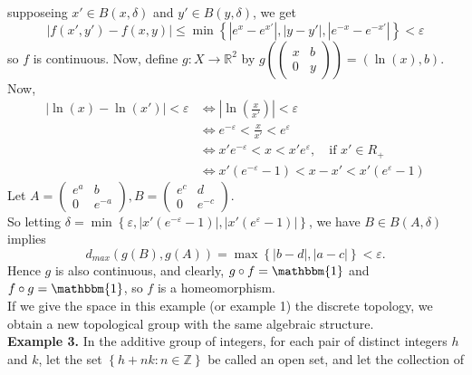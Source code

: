 \documentclass[a4paper]{article}
\theoremstyle{plain}%
\theoremstyle{definition}
\theoremstyle{remark}
\begin{document}
    supposeing $x' \in B(x,\delta)$ and $y' \in B(y,\delta)$, we get
    \[
    \left| f(x',y') - f(x,y) \right| \le 
    \min \left\{ \left| e^{x}-e^{x'} \right| , \left| y-y' \right| ,
    \left| e^{-x}-e^{-x'} \right| \right\} 
    < \varepsilon
    \] 
    so $f$ is continuous. Now, define
    $g  \colon X \to \mathbb{R}^2$ by $g\left( \begin{pmatrix} 
            x & b\\
            0 & y
    \end{pmatrix}  \right) = (\ln(x),b)$.\\
    Now, 
    \begin{align*}
        \left| \ln(x)-\ln(x') \right| < \varepsilon
        &\iff \left| \ln(\frac{x}{x'}) \right| < \varepsilon\\
        &\iff e^{-\varepsilon} < \frac{x}{x'} < e^{\varepsilon}\\
        &\iff x' e^{-\varepsilon} < x < x' e^{\varepsilon}, \quad \text{if }x'
        \in R_+\\
        &\iff x' (e^{-\varepsilon}-1) < x-x' < x'\left( e^{\varepsilon}-1 \right) 
    \end{align*}
    Let $A = \begin{pmatrix} 
        e^{a} & b \\
        0 & e^{-a}
    \end{pmatrix} , B=\begin{pmatrix} 
        e^{c}&d\\
        0 & e^{-c}
    \end{pmatrix} $.\\
    So letting
    $\delta = \min \left\{ \varepsilon, \left| x' \left( e^{-\varepsilon}-1
    \right)  \right| ,
\left| x' \left( e^{\varepsilon}-1 \right)  \right| \right\} $, we have
$B \in B(A, \delta)$ implies
\[
    d_{max}(g(B),g(A))
    = \max \left\{ \left| b-d \right| ,
    \left| a-c  \right| \right\} < \varepsilon.
\] 
Hence $g$ is also continuous, and clearly,
$g \circ f = \mathbbm{1}$ and
$f \circ g = \mathbbm{1}$, so
$f$ is a homeomorphism.\\
\linebreak
If we give the space in this example (or example 1) the discrete topology, we
obtain a new topological group with the same algebraic structure.\\
\linebreak
\textbf{Example 3.} In the additive group of integers, for each pair
of distinct integers $h$ and $k$, let the set $\left\{ h + nk  \colon
n \in \mathbb{Z} \right\} $ be called an open set, and let the collection of
\end{document}
